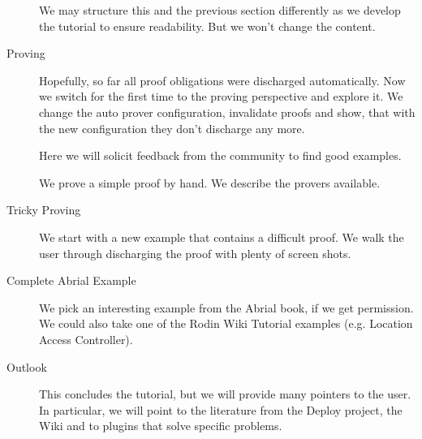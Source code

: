 \begin{description}
We may structure this and the previous section differently as we develop the tutorial to ensure readability.  But we won't change the content.

	\item[Proving] Hopefully, so far all proof obligations were discharged automatically.  Now we switch for the first time to the proving perspective and explore it.
      We change the auto prover configuration, invalidate proofs and show, that with the new configuration they don't discharge any more.

Here we will solicit feedback from the community to find good examples.


      We prove a simple proof by hand.  We describe the provers available.
	\item[Tricky Proving] We start with a new example that contains a difficult proof.  We walk the user through discharging the proof with plenty of screen shots.
	\item[Complete Abrial Example] We pick an interesting example from the Abrial book, if we get permission.  We could also take one of the Rodin Wiki Tutorial examples (e.g. Location Access Controller).
	\item[Outlook] This concludes the tutorial, but we will provide many pointers to the user.  In particular, we will point to the literature from the Deploy project, the Wiki and to plugins that solve specific problems.
\end{description}




